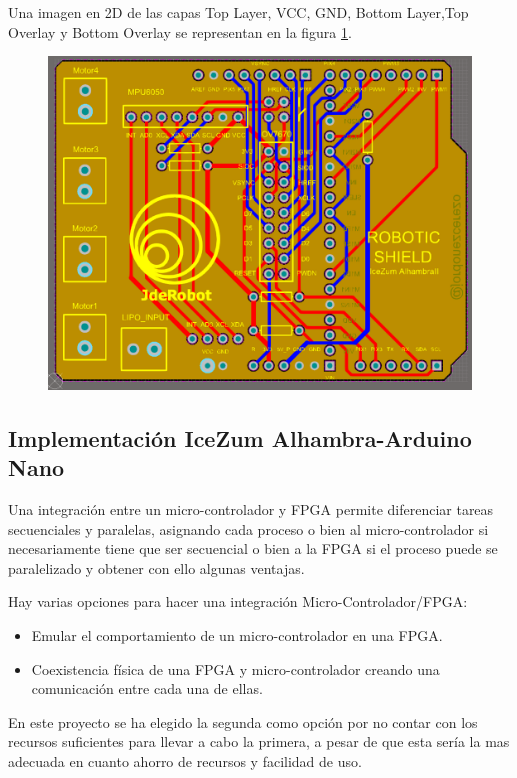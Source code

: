 Una imagen en 2D de las capas Top Layer, VCC, GND, Bottom Layer,Top Overlay y Bottom Overlay se representan en la figura \ref{fig:layers_altium}.


\begin{center}
	\begin{figure}[H]
		\center
		\includegraphics[scale=0.5, angle=90]{imagenes/Balancing_Robot/layers_altium.PNG}
		\caption{}
		\label{fig:layers_altium}
	\end{figure}
\end{center}


\subsection{Implementación IceZum Alhambra-Arduino Nano}\label{sec:Integracion}

Una integración entre un micro-controlador y FPGA permite diferenciar tareas secuenciales y paralelas, asignando cada proceso o bien al micro-controlador si necesariamente tiene que ser secuencial o bien a la FPGA si el proceso puede se paralelizado y obtener con ello algunas ventajas. \newline

Hay varias opciones para hacer una integración Micro-Controlador/FPGA:

\begin{itemize}
	\item Emular el comportamiento de un micro-controlador en una FPGA.
	\item Coexistencia física de una FPGA y micro-controlador creando una comunicación entre cada una de ellas.
\end{itemize}
En este proyecto se ha elegido la segunda como opción por no contar con los recursos suficientes para llevar a cabo la primera, a pesar de que esta sería la mas adecuada en cuanto ahorro de recursos y facilidad de uso. \newline

